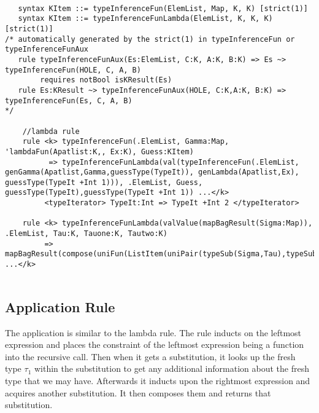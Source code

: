 \begin{lstlisting}

   syntax KItem ::= typeInferenceFun(ElemList, Map, K, K) [strict(1)]
   syntax KItem ::= typeInferenceFunLambda(ElemList, K, K, K) [strict(1)]
/* automatically generated by the strict(1) in typeInferenceFun or typeInferenceFunAux
   rule typeInferenceFunAux(Es:ElemList, C:K, A:K, B:K) => Es ~> typeInferenceFun(HOLE, C, A, B)
        requires notBool isKResult(Es)
   rule Es:KResult ~> typeInferenceFunAux(HOLE, C:K,A:K, B:K) => typeInferenceFun(Es, C, A, B)
*/     

    //lambda rule
    rule <k> typeInferenceFun(.ElemList, Gamma:Map, 'lambdaFun(Apatlist:K,, Ex:K), Guess:KItem)
          => typeInferenceFunLambda(val(typeInferenceFun(.ElemList, genGamma(Apatlist,Gamma,guessType(TypeIt)), genLambda(Apatlist,Ex), guessType(TypeIt +Int 1))), .ElemList, Guess, guessType(TypeIt),guessType(TypeIt +Int 1)) ...</k>
         <typeIterator> TypeIt:Int => TypeIt +Int 2 </typeIterator>

    rule <k> typeInferenceFunLambda(valValue(mapBagResult(Sigma:Map)), .ElemList, Tau:K, Tauone:K, Tautwo:K)
         => mapBagResult(compose(uniFun(ListItem(uniPair(typeSub(Sigma,Tau),typeSub(Sigma,funtype(Tauone,Tautwo))))),Sigma)) ...</k>
    
\end{lstlisting}

\subsection{Application Rule}

The application is similar to the lambda rule. The rule inducts on the leftmost expression and places the constraint of the leftmost expression being a function into the recursive call. Then when it gets a substitution, it looks up the fresh type \texttt{$\tau_1$} within the substitution to get any additional information about the fresh type that we may have. Afterwards it inducts upon the rightmost expression and acquires another substitution. It then composes them and returns that substitution.

\begin{prooftree}
\end{prooftree}

